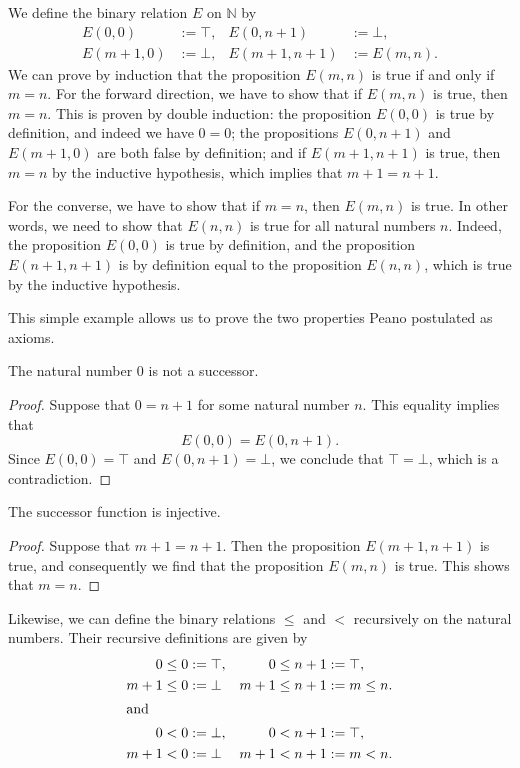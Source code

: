 \begin{example}
  We define the binary relation $E$ on $\mathbb{N}$ by
  \begin{align*}
    E(0,0) & := \top, & E(0,n+1) & := \bot, \\
    E(m+1,0) & := \bot, & E(m+1,n+1) & := E(m,n).
  \end{align*}
  We can prove by induction that the proposition $E(m,n)$ is true if and only if $m=n$. For the forward direction, we have to show that if $E(m,n)$ is true, then $m=n$. This is proven by double induction: the proposition $E(0,0)$ is true by definition, and indeed we have $0=0$; the propositions $E(0,n+1)$ and $E(m+1,0)$ are both false by definition; and if $E(m+1,n+1)$ is true, then $m=n$ by the inductive hypothesis, which implies that $m+1=n+1$.

  For the converse, we have to show that if $m=n$, then $E(m,n)$ is true. In other words, we need to show that $E(n,n)$ is true for all natural numbers $n$. Indeed, the proposition $E(0,0)$ is true by definition, and the proposition $E(n+1,n+1)$ is by definition equal to the proposition $E(n,n)$, which is true by the inductive hypothesis.
\end{example}

This simple example allows us to prove the two properties Peano postulated as axioms.

\begin{theorem}
  The natural number $0$ is not a successor.
\end{theorem}

\begin{proof}
  Suppose that $0=n+1$ for some natural number $n$. This equality implies that
  \begin{equation*}
    E(0,0)=E(0,n+1).
  \end{equation*}
  Since $E(0,0)=\top$ and $E(0,n+1)=\bot$, we conclude that $\top=\bot$, which is a contradiction.
\end{proof}

\begin{theorem}
  The successor function is injective.
\end{theorem}

\begin{proof}
  Suppose that $m+1=n+1$. Then the proposition $E(m+1,n+1)$ is true, and consequently we find that the proposition $E(m,n)$ is true. This shows that $m=n$.
\end{proof}

\begin{example}
  Likewise, we can define the binary relations $\leq$ and $<$ recursively on the natural numbers. Their recursive definitions are given by
  \begin{align*}
    0 \leq 0 & := \top, & 0\leq n+1 & := \top, \\
    m+1 \leq 0 & := \bot & m+1 \leq n+1 & := m \leq n. \\
    \intertext{and}
    0 < 0 & := \bot, & 0 < n+1 & := \top, \\
    m+1 < 0 & := \bot & m+1 < n+1 & := m < n.
  \end{align*}
\end{example}

